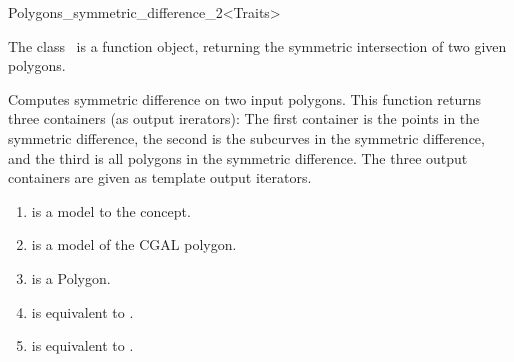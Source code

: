 
\ccRefPageBegin



\begin{ccRefFunctionObjectClass}{Polygons_symmetric_difference_2<Traits>}
\label{OVL_sec:polygon_symmetric_difference}
    
\ccDefinition
The class \ccClassTemplateName\ is a function object,
returning the symmetric intersection of two given polygons.



{Computes symmetric difference on two input polygons.
This function returns three containers (as output irerators):
The first container is the points in the symmetric difference, 
the second is the subcurves in the symmetric difference,
and the third is all polygons in the symmetric difference.
The three output containers are given as template
output iterators.
}

\begin{enumerate}
   \item
    is a model to the  concept.
   \item
    is a model of the CGAL polygon.
   \item
    is a Polygon.
   \item    
    is equivalent to .
   \item
    is equivalent to .
\end{enumerate}


\end{ccRefFunctionObjectClass}
